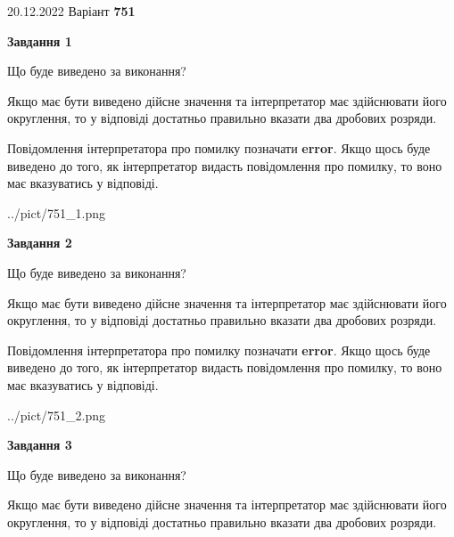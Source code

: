 \documentclass[12pt, ukrainian]{article}
\begin{document}
{20.12.2022 Варіант \No \textbf { 751 }\par}
{
\begin {Large}

{\begin {center}\textbf{Завдання 1}\end {center}}\par
Що буде виведено за виконання? \par

Якщо має бути виведено дійсне значення та інтерпретатор має здійснювати його округлення, 
то у відповіді достатньо правильно вказати два дробових розряди.

Повідомлення інтерпретатора про помилку позначати \textbf{error}.
Якщо щось буде виведено до того, як інтерпретатор видасть повідомлення про помилку, 
то воно має вказуватись у відповіді. \par

\begin{center}
	{../pict/751_1.png}
\end{center}
\newpage

{\begin {center}\textbf{Завдання 2}\end {center}}\par
Що буде виведено за виконання? \par

Якщо має бути виведено дійсне значення та інтерпретатор має здійснювати його округлення, 
то у відповіді достатньо правильно вказати два дробових розряди.

Повідомлення інтерпретатора про помилку позначати \textbf{error}.
Якщо щось буде виведено до того, як інтерпретатор видасть повідомлення про помилку, 
то воно має вказуватись у відповіді. \par

\begin{center}
	{../pict/751_2.png}
\end{center}
\newpage

{\begin {center}\textbf{Завдання 3}\end {center}}\par
Що буде виведено за виконання? \par

Якщо має бути виведено дійсне значення та інтерпретатор має здійснювати його округлення, 
то у відповіді достатньо правильно вказати два дробових розряди.


\end{Large}}
\end{document}

